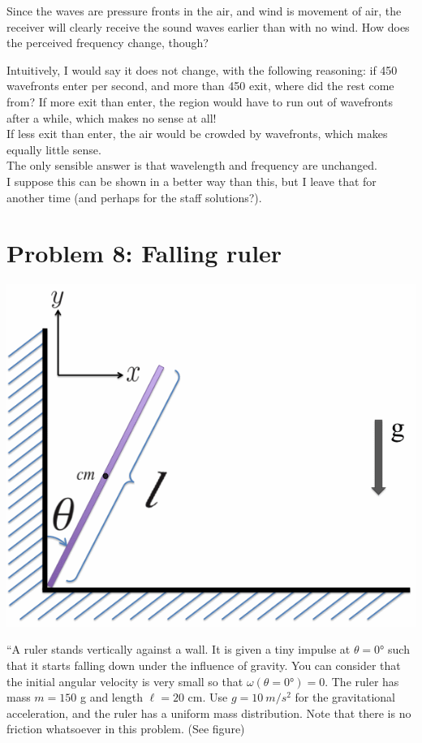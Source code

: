 \documentclass[8.01x]{subfiles}
\begin{document}
Since the waves are pressure fronts in the air, and wind is movement of air, the receiver will clearly receive the sound waves earlier than with no wind. How does the perceived frequency change, though?

Intuitively, I would say it does not change, with the following reasoning: if 450 wavefronts enter per second, and more than 450 exit, where did the rest come from? If more exit than enter, the region would have to run out of wavefronts after a while, which makes no sense at all!\\
If less exit than enter, the air would be crowded by wavefronts, which makes equally little sense.\\
The only sensible answer is that wavelength and frequency are unchanged.\\
I suppose this can be shown in a better way than this, but I leave that for another time (and perhaps for the staff solutions?).

\section{Problem 8: Falling ruler}

\begin{center}
\includegraphics[scale=0.5]{Graphics/midterm3p8}
\end{center}

``A ruler stands vertically against a wall. It is given a tiny impulse at $\theta = \ang{0}$ such that it starts falling down under the influence of gravity. You can consider that the initial angular velocity is very small so that $\omega(\theta=\ang{0})=0$. The ruler has mass $m = 150$ g and length $\ell = 20$ cm. Use $g = \SI{10}{m/s^2}$ for the gravitational acceleration, and the ruler has a uniform mass distribution. Note that there is no friction whatsoever in this problem. (See figure)
\end{document}
